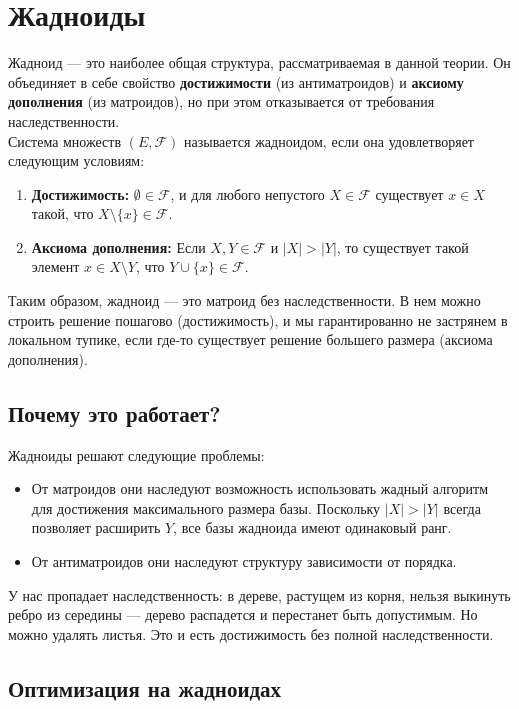 \section{Жадноиды}
Жадноид — это наиболее общая структура, рассматриваемая в данной теории. Он объединяет в себе свойство \textbf{достижимости} (из антиматроидов) и \textbf{аксиому дополнения} (из матроидов), но при этом отказывается от требования наследственности. \\

Система множеств $(E, \mathcal{F})$ называется жадноидом, если она удовлетворяет следующим условиям:
\begin{enumerate}
    \item \textbf{Достижимость:} $\emptyset \in \mathcal{F}$, и для любого непустого $X \in \mathcal{F}$ существует $x \in X$ такой, что $X \setminus \{x\} \in \mathcal{F}$.
    \item \textbf{Аксиома дополнения:} Если $X, Y \in \mathcal{F}$ и $|X| > |Y|$, то существует такой элемент $x \in X \setminus Y$, что $Y \cup \{x\} \in \mathcal{F}$.
\end{enumerate}

Таким образом, жадноид — это матроид без наследственности. В нем можно строить решение пошагово (достижимость), и мы гарантированно не застрянем в локальном тупике, если где-то существует решение большего размера (аксиома дополнения).

\subsection{Почему это работает?}

Жадноиды решают следующие проблемы:
\begin{itemize}
    \item От матроидов они наследуют возможность использовать жадный алгоритм для достижения максимального размера базы. Поскольку $|X| > |Y|$ всегда позволяет расширить $Y$, все базы жадноида имеют одинаковый ранг.
    \item От антиматроидов они наследуют структуру зависимости от порядка.
\end{itemize}
У нас пропадает наследственность: в дереве, растущем из корня, нельзя выкинуть ребро из середины — дерево распадется и перестанет быть допустимым. Но можно удалять листья. Это и есть достижимость без полной наследственности.

\subsection{Оптимизация на жадноидах}

